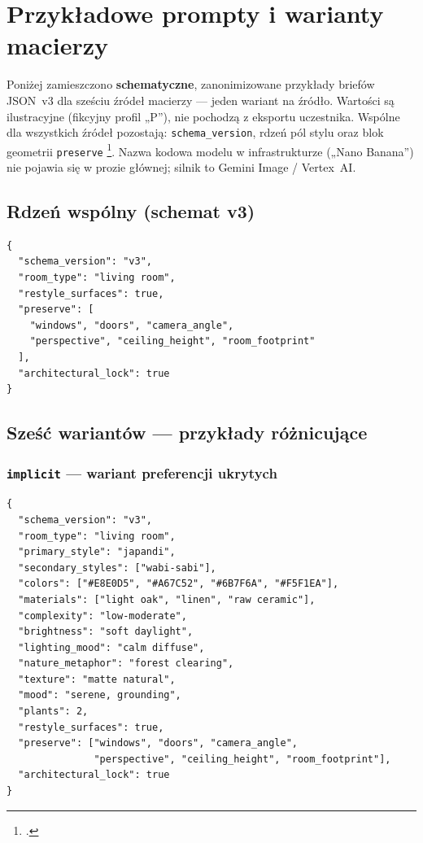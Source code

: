 \chapter{Przykładowe prompty i warianty macierzy}
\label{app:d:top}

Poniżej zamieszczono \textbf{schematyczne}, zanonimizowane przykłady briefów JSON~v3 dla sześciu źródeł macierzy --- jeden wariant na źródło. Wartości są ilustracyjne (fikcyjny profil „P”), nie pochodzą z eksportu uczestnika. Wspólne dla wszystkich źródeł pozostają: \texttt{schema\_version}, rdzeń pól stylu oraz blok geometrii \texttt{preserve} \footcite{idaPlatform2026}. Nazwa kodowa modelu w infrastrukturze („Nano Banana”) nie pojawia się w prozie głównej; silnik to Gemini Image / Vertex~AI.

\section{Rdzeń wspólny (schemat v3)}
\label{app:d:sec:rdzen}

\begin{lstlisting}[caption={Wspólny szkielet briefu JSON v3 (pola geometrii identyczne we wszystkich źródłach).},label={lst:app:d:core}]
{
  "schema_version": "v3",
  "room_type": "living room",
  "restyle_surfaces": true,
  "preserve": [
    "windows", "doors", "camera_angle",
    "perspective", "ceiling_height", "room_footprint"
  ],
  "architectural_lock": true
}
\end{lstlisting}

\section{Sześć wariantów --- przykłady różnicujące}
\label{app:d:sec:szesc}

\subsection{\texttt{implicit} --- wariant preferencji ukrytych}
\label{app:d:sec:implicit}

\begin{lstlisting}
{
  "schema_version": "v3",
  "room_type": "living room",
  "primary_style": "japandi",
  "secondary_styles": ["wabi-sabi"],
  "colors": ["#E8E0D5", "#A67C52", "#6B7F6A", "#F5F1EA"],
  "materials": ["light oak", "linen", "raw ceramic"],
  "complexity": "low-moderate",
  "brightness": "soft daylight",
  "lighting_mood": "calm diffuse",
  "nature_metaphor": "forest clearing",
  "texture": "matte natural",
  "mood": "serene, grounding",
  "plants": 2,
  "restyle_surfaces": true,
  "preserve": ["windows", "doors", "camera_angle",
               "perspective", "ceiling_height", "room_footprint"],
  "architectural_lock": true
}
\end{lstlisting}

